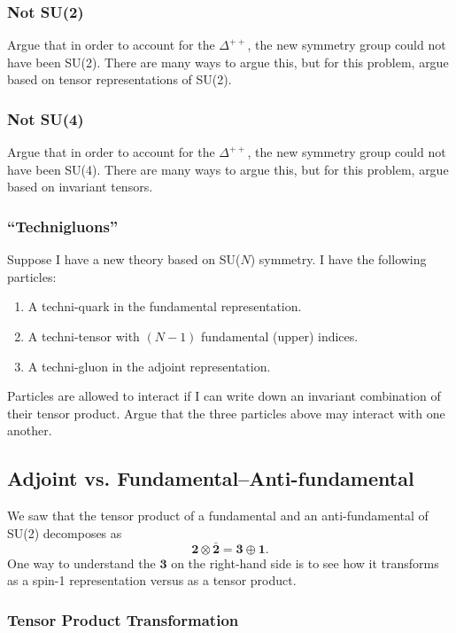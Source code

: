 \documentclass[12pt]{article}
\numberwithin{equation}{subsection}    %
\begin{document}
\subsubsection{Not SU(2)}

Argue that in order to account for the $\Delta^{++}$, the new symmetry group could not have been SU(2). There are many ways to argue this, but for this problem, argue based on tensor representations of SU(2).

\subsubsection{Not SU(4)}

Argue that in order to account for the $\Delta^{++}$, the new symmetry group could not have been SU(4). There are many ways to argue this, but for this problem, argue based on invariant tensors.


\subsubsection{``Technigluons''}

Suppose I have a new theory based on SU($N$) symmetry. I have the following particles:
\begin{enumerate}
  \item A techni-quark in the fundamental representation.
  \item A techni-tensor with $(N-1)$ fundamental (upper) indices.
  \item A techni-gluon in the adjoint representation.
\end{enumerate}
Particles are allowed to interact if I can write down an invariant combination of their tensor product. Argue that the three particles above may interact with one another.

\subsection{Adjoint vs. Fundamental--Anti-fundamental}

We saw that the tensor product of a fundamental and an anti-fundamental of SU(2) decomposes as $$\mathbf{2}\otimes\bar{\mathbf{2}} = \mathbf{3}\oplus\mathbf{1}.$$
One way to understand the $\mathbf{3}$ on the right-hand side is to see how it transforms as a spin-1 representation versus as a tensor product.

\subsubsection{Tensor Product Transformation}
\end{document}
